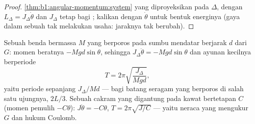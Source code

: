 \begin{proof}
\cref{thm:b1:angular-momentum:system} yang diproyeksikan pada $\Delta$, dengan $L_\Delta
= J_\Delta\dot\theta$ dan $J_\Delta$ tetap bagi ; kalikan dengan
$\dot\theta$ untuk bentuk energinya (gaya dalam sebuah  tak
melakukan usaha: jaraknya tak berubah).
\end{proof}

\begin{example}\label{ex:b1:systems-of-points:pendulums}
Sebuah benda bermassa $M$ yang berporos pada sumbu mendatar berjarak $d$
dari $G$: momen beratnya $-Mgd\sin\theta$, sehingga $J_\Delta\ddot\theta =
-Mgd\sin\theta$ dan ayunan kecilnya berperiode
\[
T = 2\pi\sqrt{\frac{J_\Delta}{Mgd}} ,
\]
yaitu periode  sepanjang $J_\Delta/Md$ --- bagi batang seragam
yang berporos di salah satu ujungnya, $2L/3$. Sebuah cakram yang digantung pada kawat bertetapan 
$C$ (momen pemulih $-C\theta$): $J\ddot\theta = -C\theta$, $T = 2\pi\sqrt{J/C}$
--- yaitu neraca  yang mengukur $G$ dan hukum Coulomb.
\end{example}

